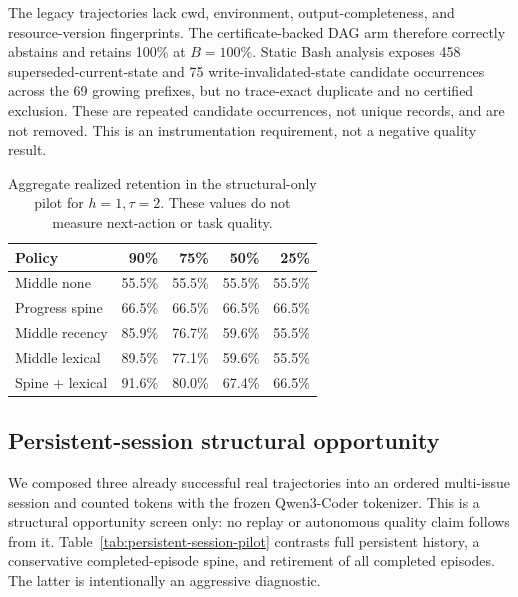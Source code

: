 \documentclass[11pt]{article}
\begin{document}
The legacy trajectories lack cwd, environment, output-completeness, and
resource-version fingerprints. The certificate-backed DAG arm therefore
correctly abstains and retains 100\% at $B=100\%$. Static Bash analysis exposes
458 superseded-current-state and 75 write-invalidated-state candidate
occurrences across the 69 growing prefixes, but no trace-exact duplicate and no
certified exclusion. These are repeated candidate occurrences, not unique
records, and are not removed. This is an instrumentation requirement, not a
negative quality result.

\begin{table}[H]
\centering
\small
\caption{Aggregate realized retention in the structural-only pilot for
$h=1,\tau=2$. These values do not measure next-action or task quality.}
\label{tab:structural-pilot}
\begin{tabular}{lrrrr}
\toprule
Policy & 90\% & 75\% & 50\% & 25\% \\
\midrule
Middle none & 55.5\% & 55.5\% & 55.5\% & 55.5\% \\
Progress spine & 66.5\% & 66.5\% & 66.5\% & 66.5\% \\
Middle recency & 85.9\% & 76.7\% & 59.6\% & 55.5\% \\
Middle lexical & 89.5\% & 77.1\% & 59.6\% & 55.5\% \\
Spine + lexical & 91.6\% & 80.0\% & 67.4\% & 66.5\% \\
\bottomrule
\end{tabular}
\end{table}

\subsection{Persistent-session structural opportunity}

We composed three already successful real trajectories into an ordered
multi-issue session and counted tokens with the frozen Qwen3-Coder tokenizer.
This is a structural opportunity screen only: no replay or autonomous quality
claim follows from it.  Table~\ref{tab:persistent-session-pilot} contrasts full
persistent history, a conservative completed-episode spine, and retirement of
all completed episodes.  The latter is intentionally an aggressive diagnostic.
\end{document}
